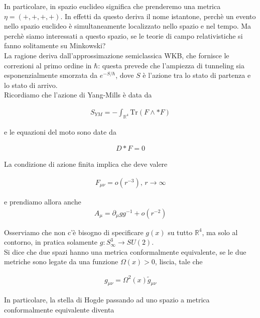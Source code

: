 \documentclass{report}
\begin{document}
In particolare, in spazio euclideo significa che prenderemo una metrica \(\eta = (+, +,+,+)\). In effetti da questo deriva il nome istantone, perchè un evento nello spazio euclideo è simultaneamente localizzato nello spazio e nel tempo. Ma perchè siamo interessati a questo spazio, se le teorie di campo relativistiche si fanno solitamente su Minkowski? \\

La ragione deriva dall'approssimazione semiclassica WKB, che fornisce le correzioni al primo ordine in \(\hbar\): questa prevede che l'ampiezza di tunneling sia esponenzialmente smorzata da \(e^{-S/\hbar}\), dove \(S\) è l'azione tra lo stato di partenza e lo stato di arrivo. \\

Ricordiamo che l'azione di Yang-Mills è data da 

\begin{align}
    S_{YM} = -\int_{\mathbb{R}^4}\text{Tr}(F\wedge *F)
\end{align}

e le equazioni del moto sono date da 

\begin{align}
    D * F =0 
\end{align}

La condizione di azione finita implica che deve valere 

\begin{align}
    F_{\mu\nu} = o(r^{-3}), \, r \rightarrow \infty
\end{align}

e prendiamo allora anche
\begin{align}
    A_{\mu} = \partial_\mu g g^{-1} + o(r^{-2})
\end{align}

Osserviamo che non c'è bisogno di specificare \(g(x)\) su tutto \(\mathbb{R}^4\), ma solo al contorno, in pratica solamente \(g : S^3_{\infty} \rightarrow SU(2)\). \\

Si dice che due spazi hanno una metrica conformalmente equivalente, se le due metriche sono legate da una funzione \(\Omega(x)>0\), liscia, tale che 

\begin{align}
    g_{\mu\nu} = \Omega^2(x)\tilde{g}_{\mu\nu}
\end{align}

In particolare, la stella di Hogde passando ad uno spazio a metrica conformalmente equivalente diventa 
\end{document}
